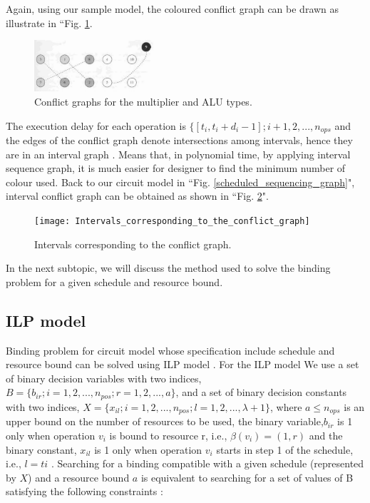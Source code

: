 Again, using our sample model, the coloured conflict graph can be drawn as illustrate in ``Fig. \ref{Conflict_graphs_for_the_mtlltiplier_and_ALU_types}.


\begin{figure}[h]
    \centering
    \includegraphics[width=0.4\textwidth]{Conflict_graphs_for_the_mtlltiplier_and_ALU_types}
    \caption{Conflict graphs for the multiplier and ALU types. \cite{main}}
    \label{Conflict_graphs_for_the_mtlltiplier_and_ALU_types}
\end{figure}

The execution delay for each operation is $\{[t_{i}, t_{i} + d_{i} - 1 ]; i + 1, 2, ...,n_{ops}$ and the edges of the conflict graph denote intersections among intervals, hence they are in an interval graph \cite{main}. Means that, in polynomial time, by applying interval sequence graph, it is much easier for designer to find the minimum number of colour used. Back to our circuit model in ``Fig. \ref{scheduled_sequencing_graph}", interval conflict graph can be obtained as shown in ``Fig. \ref{Intervals_corresponding_to_the_conflict_grap}".

\begin{figure}[h]
    \centering
    \texttt{[image: Intervals\_corresponding\_to\_the\_conflict\_graph]}
    \caption{Intervals corresponding to the conflict graph. \cite{main}}
    \label{Intervals_corresponding_to_the_conflict_grap}
\end{figure}

In the next subtopic, we will discuss the method used to solve the binding problem for a given schedule and resource bound.


\subsection{ ILP model}

Binding problem for  circuit model whose specification include schedule and resource bound can be solved using ILP model \cite{main}. For the ILP model We use a set of binary decision variables with two indices, $ B=\{b_{ir};i=1,2,...,n_{pos};r=1,2,...,a\} $, and a set of binary decision constants with two indices, $ X=\{x_{il};i=1,2,...,n_{pos};l=1,2,...,\lambda+1\} $, where $ a\leq n_{ops} $ is an upper bound on the number of resources to be used, the binary variable,$ b_{ir} $ is 1 only when operation $ v_{i} $ is bound to resource r, i.e., $ \beta(v_{i})=(1,r) $ and the binary constant, $ x_{il} $ is 1 only when operation $ v_{i} $  starts in step 1 of the schedule, i.e., $ l = t{i} $ \cite{main}. 
Searching for a binding compatible with a given schedule (represented by $X$) and a resource bound $a$  is equivalent to searching for a set of values of B satisfying  the following constraints \cite{main}: 

